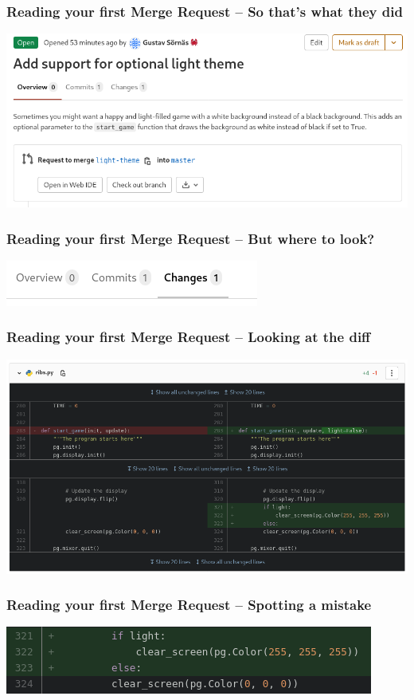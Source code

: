 \documentclass{beamer}
\begin{document}
\begin{frame}[fragile]
  \frametitle{Reading your first Merge Request -- So that's what they did}
  \includegraphics[width=\linewidth]{gitlab-first-review/02-reding.png}
\end{frame}

\begin{frame}[fragile]
  \frametitle{Reading your first Merge Request -- But where to look?}
  \includegraphics[width=\linewidth]{gitlab-first-review/03-changes.png}
\end{frame}

\begin{frame}[fragile]
  \frametitle{Reading your first Merge Request -- Looking at the diff}
  \includegraphics[width=\linewidth]{gitlab-first-review/04-thediff.png}
\end{frame}

\begin{frame}[fragile]
  \frametitle{Reading your first Merge Request -- Spotting a mistake}
  \includegraphics[width=\linewidth]{gitlab-first-review/05-oopsie.png}
\end{frame}
\end{document}
